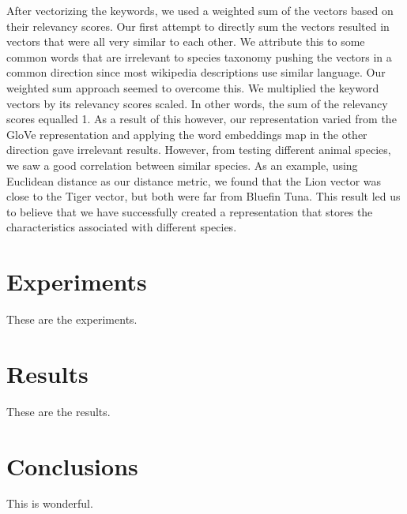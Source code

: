 \documentclass[10pt,twocolumn,letterpaper]{article}
\begin{document}
After vectorizing the keywords, we used a weighted sum of the vectors based on their relevancy scores. Our first attempt to directly sum the vectors resulted in vectors that were all very similar to each other. We attribute this to some common words that are irrelevant to species taxonomy pushing the vectors in a common direction since most wikipedia descriptions use similar language. Our weighted sum approach seemed to overcome this. We multiplied the keyword vectors by its relevancy scores scaled. In other words, the sum of the relevancy scores equalled 1. As a result of this however, our representation varied from the GloVe representation and applying the word embeddings map in the other direction gave irrelevant results. However, from testing different animal species, we saw a good correlation between similar species. As an example, using Euclidean distance as our distance metric, we found that the Lion vector was close to the Tiger vector, but both were far from Bluefin Tuna. This result led us to believe that we have successfully created a representation that stores the characteristics associated with different species. 


\section{Experiments}

These are the experiments.

\section{Results}

These are the results.

\section{Conclusions}

This is wonderful.

{\small


}
\end{document}
